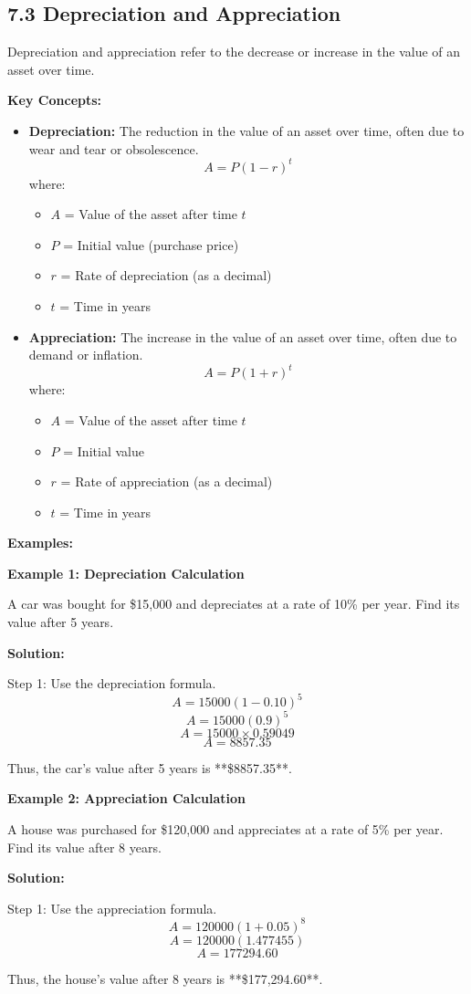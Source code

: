 
\subsection*{7.3 Depreciation and Appreciation}

Depreciation and appreciation refer to the decrease or increase in the value of an asset over time.

\textbf{Key Concepts:}
\begin{itemize}
	\item \textbf{Depreciation:} The reduction in the value of an asset over time, often due to wear and tear or obsolescence.
	\[
	A = P(1 - r)^t
	\]
	where:
	\begin{itemize}
		\item $A$ = Value of the asset after time $t$
		\item $P$ = Initial value (purchase price)
		\item $r$ = Rate of depreciation (as a decimal)
		\item $t$ = Time in years
	\end{itemize}
	
	\item \textbf{Appreciation:} The increase in the value of an asset over time, often due to demand or inflation.
	\[
	A = P(1 + r)^t
	\]
	where:
	\begin{itemize}
		\item $A$ = Value of the asset after time $t$
		\item $P$ = Initial value
		\item $r$ = Rate of appreciation (as a decimal)
		\item $t$ = Time in years
	\end{itemize}
\end{itemize}

\textbf{Examples:}

\begin{flushleft}
	\textbf{Example 1: Depreciation Calculation}
	
	A car was bought for \$15,000 and depreciates at a rate of 10\% per year. Find its value after 5 years.
	
	\textbf{Solution:}
	
	Step 1: Use the depreciation formula.
	\[
	A = 15000 (1 - 0.10)^5
	\]
	\[
	A = 15000 (0.9)^5
	\]
	\[
	A = 15000 \times 0.59049
	\]
	\[
	A = 8857.35
	\]
	
	Thus, the car's value after 5 years is **\$8857.35**.
\end{flushleft}

\begin{flushleft}
	\textbf{Example 2: Appreciation Calculation}
	
	A house was purchased for \$120,000 and appreciates at a rate of 5\% per year. Find its value after 8 years.
	
	\textbf{Solution:}
	
	Step 1: Use the appreciation formula.
	\[
	A = 120000 (1 + 0.05)^8
	\]
	\[
	A = 120000 (1.477455)
	\]
	\[
	A = 177294.60
	\]
	
	Thus, the house's value after 8 years is **\$177,294.60**.
\end{flushleft}

